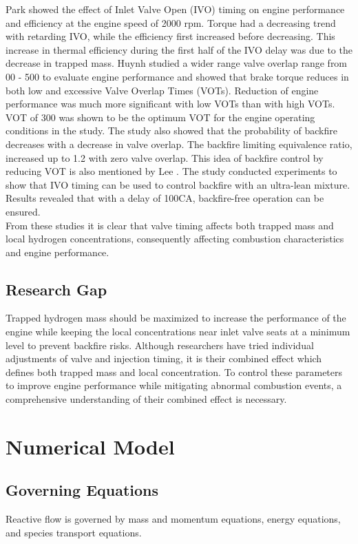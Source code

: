 \documentclass[conference]{IEEEtran}
\begin{document}
Park \cite{b6} showed the effect of Inlet Valve Open (IVO) timing on engine performance and efficiency at the engine speed of 2000 rpm.
Torque had a decreasing trend with retarding IVO, while the efficiency first increased before decreasing.
This increase in thermal efficiency during the first half of the IVO delay was due to the decrease in trapped mass.
Huynh \cite{b7} studied a wider range valve overlap range from 00 - 500 to evaluate engine performance and showed that brake torque reduces in both low and excessive Valve Overlap Times (VOTs).
Reduction of engine performance was much more significant with low VOTs than with high VOTs.
VOT of 300 was shown to be the optimum VOT for the engine operating conditions in the study.
The study also showed that the probability of backfire decreases with a decrease in valve overlap.
The backfire limiting equivalence ratio, increased up to 1.2 with zero valve overlap.
This idea of backfire control by reducing VOT is also mentioned by Lee \cite{b8}.
The study conducted experiments to show that IVO timing can be used to control backfire with an ultra-lean mixture.
Results revealed that with a delay of 100CA, backfire-free operation can be ensured.\\

From these studies it is clear that valve timing affects both trapped mass and local hydrogen concentrations, consequently affecting combustion characteristics and engine performance.

\subsection{Research Gap}

Trapped hydrogen mass should be maximized to increase the performance of the engine while keeping the local concentrations near inlet valve seats at a minimum level to prevent backfire risks.
Although researchers have tried individual adjustments of valve and injection timing, it is their combined effect which defines both trapped mass and local concentration.
To control these parameters to improve engine performance while mitigating abnormal combustion events, a comprehensive understanding of their combined effect is necessary.

\section{Numerical Model}
\subsection{Governing Equations}
Reactive flow is governed by mass and momentum equations, energy equations, and species transport equations.
\end{document}
